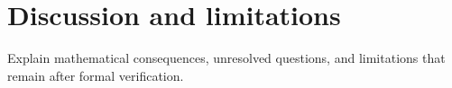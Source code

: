 \section{Discussion and limitations}
Explain mathematical consequences, unresolved questions, and limitations that remain after formal verification.
